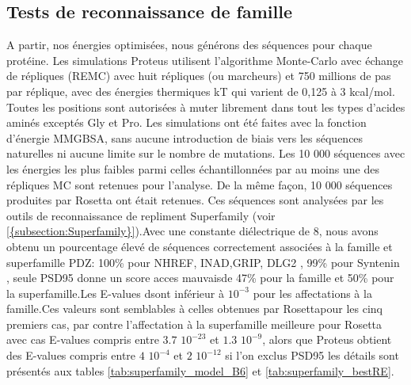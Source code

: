\subsection{Tests de reconnaissance de famille}
A partir, nos énergies optimisées, nous générons des séquences pour chaque protéine.
Les simulations Proteus utilisent l'algorithme Monte-Carlo avec échange de répliques (REMC) avec huit répliques (ou marcheurs) et 750 millions de pas par réplique, avec des énergies thermiques kT  qui varient de 0,125 à 3 kcal/mol. Toutes les positions sont autorisées à muter librement dans tout les types d'acides aminés exceptés Gly et Pro. Les simulations ont été faites avec la fonction d'énergie MMGBSA, sans aucune introduction de biais vers les séquences naturelles ni aucune limite sur le nombre de mutations. Les 10 000 séquences avec les énergies les plus faibles parmi celles échantillonnées par au moins une des répliques MC sont retenues pour l'analyse. De la même façon, 10 000 séquences produites par Rosetta ont était retenues. Ces séquences sont analysées par les outils de reconnaissance de repliment \og Superfamily \fg (voir \ref{{subsection:Superfamily}}).Avec une constante diélectrique de 8, nous avons obtenu un pourcentage élevé de séquences correctement associées à la famille et superfamille PDZ: 100\% pour NHREF, INAD,GRIP, DLG2 , 99\%  pour Syntenin , seule PSD95 donne un score acces mauvaisde 47\% pour la famille et 50\% pour la superfamille.Les E-values dsont inférieur à $10^{-3}$ pour les affectations à la famille.Ces valeurs sont semblables à celles obtenues par Rosettapour les cinq premiers cas, par contre l'affectation à la superfamille meilleure pour Rosetta avec cas E-values compris entre $3.7$ $10^{-23}$ et $1.3$ $10^{-9}$, alors que Proteus obtient des E-values compris entre $4$ $10^{-4}$ et $2$ $10^{-12}$ si l'on exclus PSD95 les détails sont présentés aux tables \ref{tab:superfamily_model_B6} et \ref{tab:superfamily_bestRE}.


